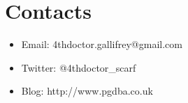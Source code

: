 \chapter{Contacts}
\label{cha:CONTACTS}

\begin{itemize}
\item Email: 4thdoctor.gallifrey@gmail.com
\item Twitter: @4thdoctor\_scarf
\item Blog: http://www.pgdba.co.uk
\end{itemize}

